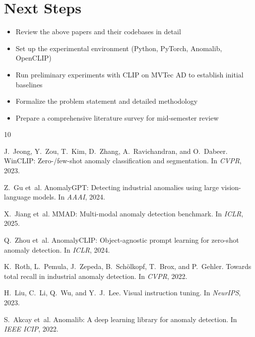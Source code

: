 \documentclass[12pt, a4paper]{article}
\begin{document}
\section{Next Steps}

\begin{itemize}[leftmargin=*]
    \item Review the above papers and their codebases in detail
    \item Set up the experimental environment (Python, PyTorch, Anomalib, OpenCLIP)
    \item Run preliminary experiments with CLIP on MVTec AD to establish initial baselines
    \item Formalize the problem statement and detailed methodology
    \item Prepare a comprehensive literature survey for mid-semester review
\end{itemize}

\begin{thebibliography}{10}

J.~Jeong, Y.~Zou, T.~Kim, D.~Zhang, A.~Ravichandran, and O.~Dabeer.
\newblock WinCLIP: Zero-/few-shot anomaly classification and segmentation.
\newblock In \emph{CVPR}, 2023.

Z.~Gu et~al.
\newblock AnomalyGPT: Detecting industrial anomalies using large vision-language models.
\newblock In \emph{AAAI}, 2024.

X.~Jiang et~al.
\newblock MMAD: Multi-modal anomaly detection benchmark.
\newblock In \emph{ICLR}, 2025.

Q.~Zhou et~al.
\newblock AnomalyCLIP: Object-agnostic prompt learning for zero-shot anomaly detection.
\newblock In \emph{ICLR}, 2024.

K.~Roth, L.~Pemula, J.~Zepeda, B.~Sch{\"o}lkopf, T.~Brox, and P.~Gehler.
\newblock Towards total recall in industrial anomaly detection.
\newblock In \emph{CVPR}, 2022.

H.~Liu, C.~Li, Q.~Wu, and Y.~J.~Lee.
\newblock Visual instruction tuning.
\newblock In \emph{NeurIPS}, 2023.

S.~Akcay et~al.
\newblock Anomalib: A deep learning library for anomaly detection.
\newblock In \emph{IEEE ICIP}, 2022.

\end{thebibliography}
\end{document}
